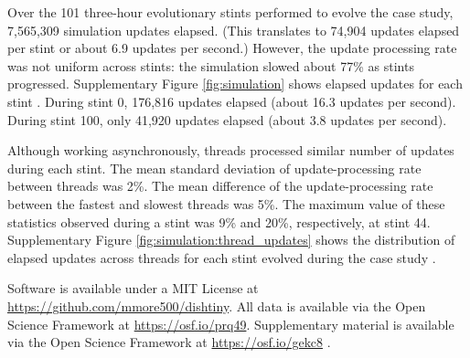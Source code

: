 Over the 101 three-hour evolutionary stints performed to evolve the case study, 7,565,309 simulation updates elapsed.
(This translates to 74,904 updates elapsed per stint or about 6.9 updates per second.)
However, the update processing rate was not uniform across stints: the simulation slowed about 77\% as stints progressed.
Supplementary Figure \ref{fig:simulation} shows elapsed updates for each stint \citep{Moreno_2021}.
During stint 0, 176,816 updates elapsed (about 16.3 updates per second).
During stint 100, only 41,920 updates elapsed (about 3.8 updates per second).

Although working asynchronously, threads processed similar number of updates during each stint.
The mean standard deviation of update-processing rate between threads was 2\%.
The mean difference of the update-processing rate between the fastest and slowest threads was 5\%.
The maximum value of these statistics observed during a stint was 9\% and 20\%, respectively, at stint 44.
Supplementary Figure \ref{fig:simulation:thread_updates} shows the distribution of elapsed updates across threads for each stint evolved during the case study \citep{Moreno_2021}.

Software is available under a MIT License at \url{https://github.com/mmore500/dishtiny}.
All data is available via the Open Science Framework at \url{https://osf.io/prq49}.
Supplementary material is available via the Open Science Framework at \url{https://osf.io/gekc8} \citep{Moreno_2021}.
